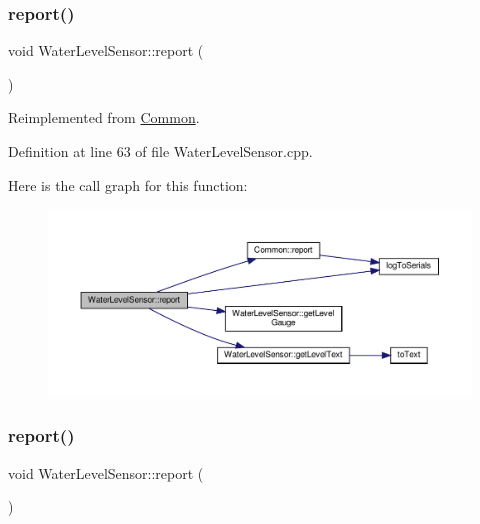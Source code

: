 \subsubsection{\texorpdfstring{report()}{report()}\hspace{0.1cm}{\footnotesize\ttfamily [1/2]}}
{\footnotesize\ttfamily void Water\+Level\+Sensor\+::report (\begin{DoxyParamCaption}{ }\end{DoxyParamCaption})\hspace{0.3cm}{\ttfamily [virtual]}}



Reimplemented from \hyperlink{class_common_a9e60e2c26a5f4d72342a59a969954636}{Common}.



Definition at line 63 of file Water\+Level\+Sensor.\+cpp.

Here is the call graph for this function\+:
\nopagebreak
\begin{figure}[H]
\begin{center}
\leavevmode
\includegraphics[width=350pt]{class_water_level_sensor_af9082a30fbe3af588c2bd3c82acfaf8e_cgraph}
\end{center}
\end{figure}
\mbox{\label{class_water_level_sensor_af9082a30fbe3af588c2bd3c82acfaf8e}} 
\subsubsection{\texorpdfstring{report()}{report()}\hspace{0.1cm}{\footnotesize\ttfamily [2/2]}}
{\footnotesize\ttfamily void Water\+Level\+Sensor\+::report (\begin{DoxyParamCaption}{ }\end{DoxyParamCaption})\hspace{0.3cm}{\ttfamily [virtual]}}



